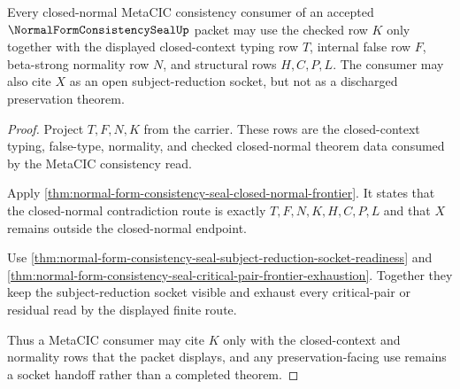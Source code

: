\begin{theorem}
\label{thm:normal-form-consistency-seal-metacic-consumer-boundary}
Every closed-normal MetaCIC consistency consumer of an accepted
$\NormalFormConsistencySealUp$ packet may use the checked row $K$ only together
with the displayed closed-context typing row $T$, internal false row $F$,
beta-strong normality row $N$, and structural rows $H,C,P,L$. The consumer may
also cite $X$ as an open subject-reduction socket, but not as a discharged
preservation theorem.
\end{theorem}
\begin{proof}
Project $T,F,N,K$ from the carrier. These rows are the closed-context typing,
false-type, normality, and checked closed-normal theorem data consumed by the
MetaCIC consistency read.

Apply \autoref{thm:normal-form-consistency-seal-closed-normal-frontier}. It
states that the closed-normal contradiction route is exactly
$T,F,N,K,H,C,P,L$ and that $X$ remains outside the closed-normal endpoint.

Use \autoref{thm:normal-form-consistency-seal-subject-reduction-socket-readiness}
and \autoref{thm:normal-form-consistency-seal-critical-pair-frontier-exhaustion}.
Together they keep the subject-reduction socket visible and exhaust every
critical-pair or residual read by the displayed finite route.

Thus a MetaCIC consumer may cite $K$ only with the closed-context and normality
rows that the packet displays, and any preservation-facing use remains a socket
handoff rather than a completed theorem.
\end{proof}


